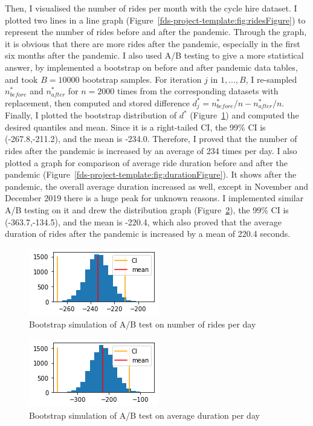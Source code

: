 \documentclass[11pt,a4paper]{article}
\begin{document}
Then, I visualised the number of rides per month with the cycle hire dataset. I plotted two lines in a line graph (Figure~\ref{fds-project-template:fig:ridesFigure}) to represent the number of rides before and after the pandemic. Through the graph, it is obvious that there are more rides after the pandemic, especially in the first six months after the pandemic. I also used A/B testing to give a more statistical answer, by implemented a bootstrap on before and after pandemic data tables, and took $B=10000$ bootstrap samples. For iteration $j$ in $1,...,B$, I re-sampled $n_{before}^*$ and $n_{after}^*$ for $n = 2000$ times from the corresponding datasets with replacement, then computed and stored difference $d_j^* = n_{before}^*/n - n_{after}^*/n$. Finally, I plotted the bootstrap distribution of $d^*$ (Figure~\ref{fds-project-template:fig:ab1}) and computed the desired quantiles and mean. Since it is a right-tailed CI, the 99\% CI is (-267.8,-211.2), and the mean is -234.0. Therefore, I proved that the number of rides after the pandemic is increased by an average of 234 times per day. I also plotted a graph for comparison of average ride duration before and after the pandemic (Figure~\ref{fds-project-template:fig:durationFigure}). It shows after the pandemic, the overall average duration increased as well, except in November and December 2019 there is a huge peak for unknown reasons. I implemented similar A/B testing on it and drew the distribution graph (Figure~\ref{fds-project-template:fig:ab2}), the 99\% CI is (-363.7,-134.5), and the mean is -220.4, which also proved that the average duration of rides after the pandemic is increased by a mean of 220.4 seconds.

\begin{figure}[ht!]
  \centering
  \includegraphics{ab1.png}
  \caption{Bootstrap simulation of A/B test on number of rides per day}
  \label{fds-project-template:fig:ab1}
\end{figure}

\begin{figure}[ht!]
  \centering
  \includegraphics{ab2.png}
  \caption{Bootstrap simulation of A/B test on average duration per day}
  \label{fds-project-template:fig:ab2}
\end{figure}
\end{document}
